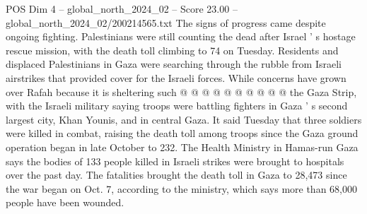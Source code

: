 \begin{textsample}{POS Dim 4 – global\_north\_2024\_02 – Score 23.00 – global\_north\_2024\_02/200214565.txt}
The signs of progress came despite ongoing fighting.
Palestinians were still counting the dead after Israel ' s hostage rescue mission, with the death toll climbing to 74 on Tuesday.
Residents and displaced Palestinians in Gaza were searching through the rubble from Israeli airstrikes that provided cover for the Israeli forces.
While concerns have grown over Rafah because it is sheltering such @ @ @ @ @ @ @ @ @ @ the Gaza Strip, with the Israeli military saying troops were battling fighters in Gaza ' s second largest city, Khan Younis, and in central Gaza.
It said Tuesday that three soldiers were killed in combat, raising the death toll among troops since the Gaza ground operation began in late October to 232.
The Health Ministry in Hamas-run Gaza says the bodies of 133 people killed in Israeli strikes were brought to hospitals over the past day.
The fatalities brought the death toll in Gaza to 28,473 since the war began on Oct. 7, according to the ministry, which says more than 68,000 people have been wounded.

\end{textsample}
